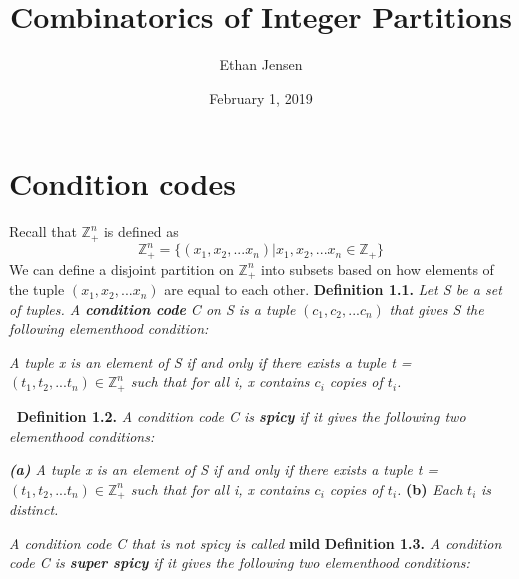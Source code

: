 \documentclass[12pt]{article}
\title{Combinatorics of Integer Partitions}
\author{Ethan Jensen}
\date{February 1, 2019}
\begin{document}
	\maketitle
\section{Condition codes}
\noindent
Recall that \(\mathbb{Z}_+^n\) is defined as
\[\mathbb{Z}_+^n=\{(x_1,x_2,...x_n)|x_1,x_2,...x_n\in\mathbb{Z}_+\}\]
We can define a disjoint partition on \(\mathbb{Z}_+^n\) into subsets based on how elements of the tuple \((x_1,x_2,...x_n)\) are equal to each other.
\newline \newline
\textbf{Definition 1.1.} \textit{Let S be a set of tuples. A \textbf{condition code} C on S is a tuple} \((c_1, c_2,...c_n)\) \textit{that gives S the following elementhood condition:} \newline
\begin{adjustwidth}{2.5em}{0pt}
	\textit{A tuple x is an element of S if and only if there exists a tuple t = \((t_1,t_2,...t_n) \in \mathbb{Z}_+^n\) such that for all i, x contains \(c_i\) copies of \(t_i\).}
\end{adjustwidth}
\(\ \)
\newline
\textbf{Definition 1.2.} \textit{A condition code C is \textbf{spicy} if it gives the following two elementhood conditions:}
\begin{adjustwidth}{2.5em}{0pt}
	\textit{\textbf{(a)} A tuple x is an element of S if and only if there exists a tuple t = \((t_1,t_2,...t_n) \in \mathbb{Z}_+^n\) such that for all i, x contains \(c_i\) copies of \(t_i\).}
	\newline
	\newline
 \textbf{(b) } \textit{Each }\(t_i\)\textit{ is distinct.}
\end{adjustwidth}
\textit{A condition code C that is not spicy is called }\textbf{mild}
\newline
\newline
\textbf{Definition 1.3.} \textit{A condition code C is \textbf{super spicy} if it gives the following two elementhood conditions:}
\end{document}
